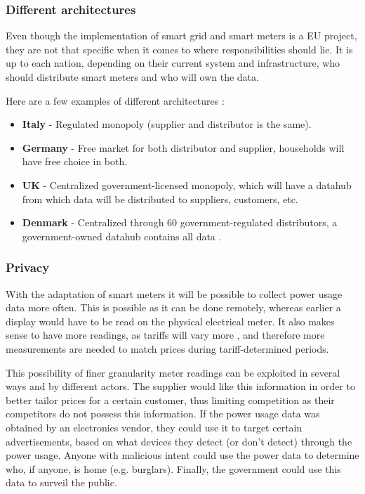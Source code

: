 \subsubsection{Different architectures}
Even though the implementation of smart grid and smart meters is a EU project, they are not that specific when it comes to where responsibilities should lie.
It is up to each nation, depending on their current system and infrastructure, who should distribute smart meters and who will own the data.

Here are a few examples of different architectures \cite{smart_meter_survey}:
\begin{itemize}
	\item \textbf{Italy} - Regulated monopoly (supplier and distributor is the same).
	\item \textbf{Germany} - Free market for both distributor and supplier, households will have free choice in both.
	\item \textbf{UK} - Centralized government-licensed monopoly, which will have a datahub from which data will be distributed to suppliers, customers, etc.
	\item \textbf{Denmark} - Centralized through 60 government-regulated distributors, a government-owned datahub contains all data \cite{dk_marked,LOV_nr_575_af_18-06-2012}.
\end{itemize}

\subsubsection{Privacy}
With the adaptation of smart meters it will be possible to collect power usage data more often.
This is possible as it can be done remotely, whereas earlier a display would have to be read on the physical electrical meter.
It also makes sense to have more readings, as tariffs will vary more \cite{directive_2009_72_EC, eu_smart_meter_pricing}, and therefore more measurements are needed to match prices during tariff-determined periods.

This possibility of finer granularity meter readings can be exploited in several ways and by different actors.
The supplier would like this information in order to better tailor prices for a certain customer, thus limiting competition as their competitors do not possess this information.
If the power usage data was obtained by an electronics vendor, they could use it to target certain advertisements, based on what devices they detect (or don't detect) through the power usage.
Anyone with malicious intent could use the power data to determine who, if anyone, is home (e.g. burglars).
Finally, the government could use this data to surveil the public.

